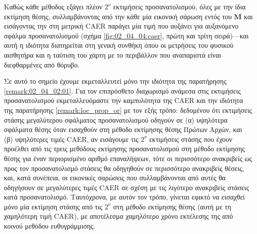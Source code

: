 Καθώς κάθε μέθοδος εξάγει πλέον $2^\nu$ εκτιμήσεις προσανατολισμού, όλες με την
ίδια εκτίμηση θέσης, συλλαμβάνοντας από την κάθε μία εικονική σάρωση εντός του
$\bm{M}$ και εισάγοντας την στη μετρική CAER παράγει μία τιμή που αυξάνει για
αυξανόμενο σφάλμα προσανατολισμοϋ (σχήμα \ref{fig:02_04_04:caer}, πρώτη και
τρίτη σειρά)---και αυτή η ιδιότητα διατηρείται στη γενική συνθήκη όπου οι
μετρήσεις του φυσικού αισθητήρα και η ταύτιση του χάρτη με το περιβάλλον που
αναπαριστά είναι διεφθαρμένες από θόρυβο.

Σε αυτό το σημείο έχουμε εκμεταλλευτεί μόνο την ιδιότητα της παρατήρησης
\ref{remark:02_04_02:01}. Για τον επιπρόσθετο διαχωρισμό ανάμεσα στις
εκτιμήσεις προσανατολισμού εκμεταλλευόμαστε την καμπυλότητα της CAER και την
ιδιότητα της παρατήρησης \ref{remark:loc_prop_or} με τον εξής τρόπο: δεδομένου
ότι εκτιμήσεις στάσης μεγαλύτερου σφάλματος  προσανατολισμού οδηγούν σε (α)
υψηλότερα σφάλματα θέσης όταν εισαχθούν στη μέθοδο εκτίμησης θέσης Πρώτων
Αρχών, και (β) υψηλότερες τιμές CAER, αν εισάγουμε τις $2^\nu$ εκτιμήσεις
στάσης που έχουν προέλθει από τις τρεις μεθόδους εκτίμησης προσανατολισμού στη
μέθοδο εκτίμησης θέσης για έναν περιορισμένο αριθμό επαναλήψεων, τότε οι
περισσότερο ανακριβείς ως προς τον προσανατολισμό στάσεις θα οδηγηθούν σε
περισσότερο ανακριβείς θέσεις, και, κατά συνέπεια, οι εικονικές σαρώσεις που
συλλαμβάνονται από αυτές θα οδηγήσουν σε μεγαλύτερες τιμές CAER σε σχέση με τις
λιγότερο ανακριβείς στάσεις κατά προσανατολισμό. Ταυτόχρονα, με αυτόν τον
τρόπο, γίνεται εφικτό να εισαχθεί μόνο μία εκτίμηση στάσης από τις $2^\nu$ στη
μέθοδο εκτίμησης θέσης (αυτή με τη χαμηλότερη τιμή CAER), με αποτέλεσμα
χαμηλότερο χρόνο εκτέλεσης της από κοινού μεθόδου ευθυγράμμισης.


\begin{figure}[!h]\centering
  
  \caption{}
  \label{fig:02_04_04:inner_rotation_system}
\end{figure}


